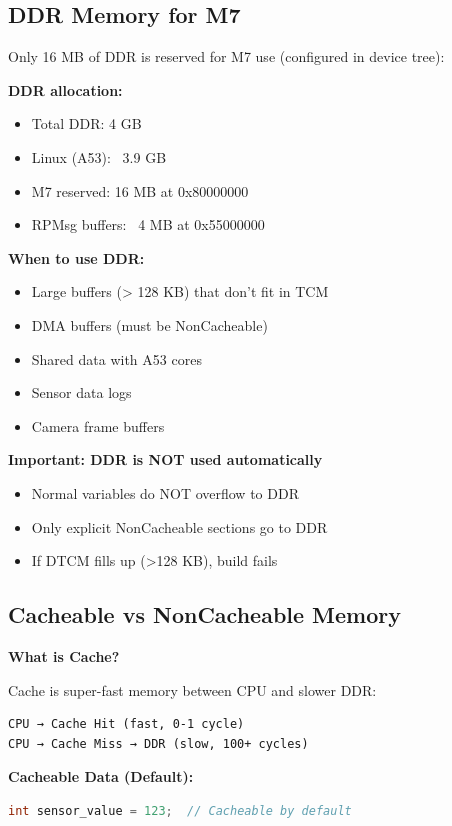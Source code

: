 \documentclass[12pt,a4paper]{report}
\begin{document}
\subsection{DDR Memory for M7}

Only 16 MB of DDR is reserved for M7 use (configured in device tree):

\textbf{DDR allocation:}
\begin{itemize}
    \item Total DDR: 4 GB
    \item Linux (A53): ~3.9 GB
    \item M7 reserved: 16 MB at 0x80000000
    \item RPMsg buffers: ~4 MB at 0x55000000
\end{itemize}

\textbf{When to use DDR:}
\begin{itemize}
    \item Large buffers (> 128 KB) that don't fit in TCM
    \item DMA buffers (must be NonCacheable)
    \item Shared data with A53 cores
    \item Sensor data logs
    \item Camera frame buffers
\end{itemize}

\textbf{Important: DDR is NOT used automatically}
\begin{itemize}
    \item Normal variables do NOT overflow to DDR
    \item Only explicit NonCacheable sections go to DDR
    \item If DTCM fills up (>128 KB), build fails
\end{itemize}

\subsection{Cacheable vs NonCacheable Memory}

\textbf{What is Cache?}

Cache is super-fast memory between CPU and slower DDR:

\begin{verbatim}
CPU → Cache Hit (fast, 0-1 cycle)
CPU → Cache Miss → DDR (slow, 100+ cycles)
\end{verbatim}

\textbf{Cacheable Data (Default):}
\begin{lstlisting}[language=c]
int sensor_value = 123;  // Cacheable by default
\end{lstlisting}
\end{document}

